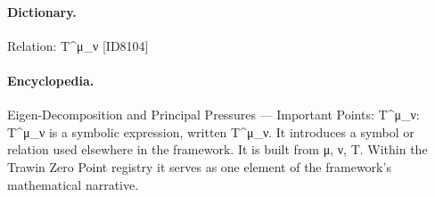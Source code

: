 \paragraph{Dictionary.}
Relation: T\textasciicircum{}μ\_ν [ID8104]

\paragraph{Encyclopedia.}
Eigen-Decomposition and Principal Pressures — Important Points: T\textasciicircum{}μ\_ν: T\textasciicircum{}μ\_ν is a symbolic expression, written T\textasciicircum{}μ\_ν. It introduces a symbol or relation used elsewhere in the framework. It is built from μ, ν, T. Within the Trawin Zero Point registry it serves as one element of the framework's mathematical narrative.
